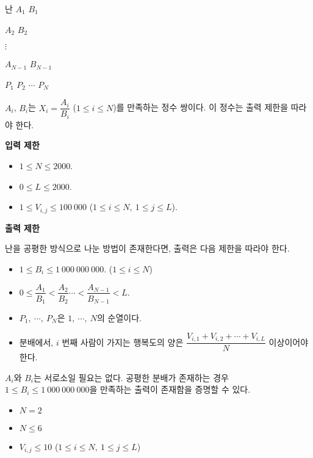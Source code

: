 \begin{problem}{난}
	$A_1$ $B_1$

	$A_2$ $B_2$

	$\vdots$ 
	
	$A_{N-1}$ $B_{N-1}$
	
	$P_1$ $P_2$ $\cdots$ $P_N$
	
	$A_i$, $B_i$는 $X_i = \dfrac{A_i}{B_i}$ ($1 \le i \le N$)를 만족하는 정수 쌍이다. 이 정수는 출력 제한을 따라야 한다.
	
	\Constraints


	{
	\large
	\textbf{입력 제한}
	}

	\begin{itemize}
		
		\item $1 \le N \le 2000$.
		\item $0 \le L \le 2000$.
		\item $1 \le V_{i, j} \le 100\ 000$ ($1 \le i \le N,\ 1 \le j \le L$).
	\end{itemize}

	{
	\large
	\textbf{출력 제한}
	}

	
	난을 공평한 방식으로 나눈 방법이 존재한다면, 출력은 다음 제한을 따라야 한다.
	
	\begin{itemize}
		\item $1 \le B_i \le 1\ 000\ 000\ 000$. ($1 \le i \le N$)
		\item $0 \le \dfrac{A_1}{B_1} < \dfrac{A_2}{B_2} \cdots < \dfrac{A_{N-1}}{B_{N-1}} < L$.
		\item $P_1, \ \cdots, \ P_N$은 $1, \ \cdots, \ N$의 순열이다.
		\item 분배에서, $i$ 번째 사람이 가지는 행복도의 양은 $\dfrac{V_{i, 1}+V_{i,2}+\cdots+V_{i,L}}{N}$ 이상이어야 한다.
	\end{itemize}
	
	$A_i$와 $B_i$는 서로소일 필요는 없다.
	공평한 분배가 존재하는 경우 $1 \le B_i \le 1\ 000\ 000\ 000$을 만족하는 출력이 존재함을 증명할 수 있다.
	
	\begin{itemize}
		\item $N = 2$
	\end{itemize}
	
	\begin{itemize}
		\item $N \le 6$ 
		\item $V_{i, j} \le 10$ ($1 \le i \le N,\ 1 \le j \le L$)
	\end{itemize}
	

\end{problem}
